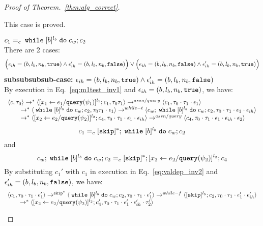 \begin{proof}[Proof of Theorem.~\ref{thm:alg_correct}]
\begin{case}
\begin{subcase}
\begin{subsubcase}
\begin{subsubsubcase}
\begin{subproof}
\begin{enumerate}
%
\end{enumerate}
%
This case is proved.
\end{subproof}
%
\begin{subproof} $c_1 =_c \;\mathtt{while}\; [b]^{l_b} \;\mathtt{do}\; c_w;{c}_2$ 
%
\\
There are 2 cases:
$$
\Big(\mathtt{\epsilon}_{ih} = (b, l_b, n_b, \mathtt{true}) \land \mathtt{\epsilon}_{ih}' = (b, l_b, n_b, \mathtt{false}) \Big)
\lor 
\Big(\mathtt{\epsilon}_{ih} = (b, l_b, n_b, \mathtt{false}) \land \mathtt{\epsilon}_{ih}' = (b, l_b, n_b, \mathtt{true}) \Big)
$$
%
\textbf{subsubsubsub-case:} $\mathtt{\epsilon}_{ih} = (b, l_b, n_b, \mathtt{true}) \land \mathtt{\epsilon}_{ih}' = (b, l_b, n_b, \mathtt{false})$
\\
By execution in Eq.~\ref{eq:m1test_inv1} and $\mathtt{\epsilon}_{ih} = (b, l_b, n_b, \mathtt{true})$, we have:
\[
  \begin{array}{l}   
  \langle {c}, \mathtt{\tau}_0 \rangle \rightarrow^{*} 
  \langle [\mathrel{ {x}_1 \leftarrow e_1 / {\tt query}(\psi_1) }]^{l_1} ; {c}_1, \mathtt{\tau}_0 \mathtt{\tau}_1 \rangle  
  \rightarrow^{assn/query}
  \langle c_1, \mathtt{\tau}_0 \cdot \mathtt{\tau}_1 \cdot \mathtt{\epsilon}_1 \rangle 
  \\
  \qquad \rightarrow^{*} 
  \langle \;\mathtt{while}\; [b]^{l_b} \;\mathtt{do}\; c_w;{c}_2, 
  \mathtt{\tau}_0 \mathtt{\tau}_1 \cdot \mathtt{\epsilon}_1 \rangle 
  \rightarrow^{while-t} 
  \langle c_w;\;\mathtt{while}\; [b]^{l_b} \;\mathtt{do}\; c_w; c_2, \mathtt{\tau}_0 \cdot \mathtt{\tau}_1 \cdot \mathtt{\epsilon}_1 \cdot \mathtt{\epsilon}_{ih} \rangle 
  \\
  \qquad \rightarrow^{*} 
  \langle [\mathrel{ {x}_2 \leftarrow e_2 / {\tt query}(\psi_2) }]^{l_2};{c}_4, 
  \mathtt{\tau}_0 \cdot \mathtt{\tau}_1 \cdot \mathtt{\epsilon}_1 \cdot \mathtt{\epsilon}_{ih} \rangle 
  \rightarrow^{assn/query} 
  \langle {c}_4,  \mathtt{\tau}_0 \cdot \mathtt{\tau}_1 \cdot \mathtt{\epsilon}_1 \cdot \mathtt{\epsilon}_{ih} \cdot \mathtt{\epsilon}_2 \rangle 
  \end{array}
\]
% 
\[
  c_1 =_c [\mathtt{skip}]{}^*; \;\mathtt{while}\; [b]^{l_b} \;\mathtt{do}\; c_w;{c}_2
\]
and
\[
  c_w;\;\mathtt{while}\; [b]^{l_b} \;\mathtt{do}\; c_w; c_2 =_c [\mathtt{skip}]{}^*;[\mathrel{ {x}_2 \leftarrow e_2 / {\tt query}(\psi_2) }]^{l_2};{c}_4
\]
%
By substituting $c_1'$ with $c_1$ in execution in Eq.~\ref{eq:valdep_inv2} and $\mathtt{\epsilon}_{ih}' = (b, l_b, n_b, \mathtt{false})$, we have:
  \[
  \begin{array}{l}   
  \langle c_1, \mathtt{\tau}_0 \cdot \mathtt{\tau}_1 \cdot \mathtt{\epsilon}_1' \rangle 
  \rightarrow^{\mathtt{skip}^*} 
  \langle \;\mathtt{while}\; [b]^{l_b} \;\mathtt{do}\; c_w;{c}_2, \mathtt{\tau}_0 \cdot \mathtt{\tau}_1 \cdot \mathtt{\epsilon}_1' \rangle 
  \rightarrow^{while-f} 
  \langle [\mathtt{skip}]^{l_b};c_2, \mathtt{\tau}_0 \cdot \mathtt{\tau}_1 \cdot \mathtt{\epsilon}_1' \cdot \mathtt{\epsilon}_{ih}' \rangle 
  \\
  \qquad \rightarrow^{*} 
  \langle [\mathrel{ {x}_2 \leftarrow e_2 / {\tt query}(\psi_2) }]^{l_2};{c}_4', 
  \mathtt{\tau}_0 \cdot \mathtt{\tau}_1 \cdot \mathtt{\epsilon}_1' \cdot \mathtt{\epsilon}_{ih}' \cdot \mathtt{\tau}_2' \rangle

\end{array}\]
\end{subproof}
\end{subsubsubcase}
\end{subsubcase}
\end{subcase}
\end{case}
\end{proof}
